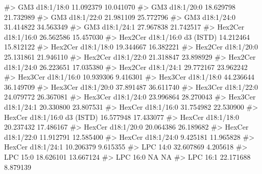 \documentclass[
  letterpaper,
  DIV=11,
  numbers=noendperiod]{scrreprt}
\newenvironment{Shaded}{\begin{snugshade}}{\end{snugshade}}
\newcommand{\CommentTok}[1]{\textcolor[rgb]{0.37,0.37,0.37}{#1}}
\begin{document}
\begin{Shaded}
\begin{Highlighting}[]
\CommentTok{\#\textgreater{} GM3 d18:1/18:0                            11.092379 10.041070}
\CommentTok{\#\textgreater{} GM3 d18:1/20:0                            18.629798 21.732989}
\CommentTok{\#\textgreater{} GM3 d18:1/22:0                            21.981109 25.772796}
\CommentTok{\#\textgreater{} GM3 d18:1/24:0                            31.414822 34.563349}
\CommentTok{\#\textgreater{} GM3 d18:1/24:1                            27.967838 21.742517}
\CommentTok{\#\textgreater{} Hex2Cer d18:1/16:0                        26.562586 15.457030}
\CommentTok{\#\textgreater{} Hex2Cer d18:1/16:0 d3 (ISTD)              14.212464 15.812122}
\CommentTok{\#\textgreater{} Hex2Cer d18:1/18:0                        19.344667 16.382221}
\CommentTok{\#\textgreater{} Hex2Cer d18:1/20:0                        25.131861 21.946110}
\CommentTok{\#\textgreater{} Hex2Cer d18:1/22:0                        21.318847 23.898929}
\CommentTok{\#\textgreater{} Hex2Cer d18:1/24:0                        26.223651 17.035380}
\CommentTok{\#\textgreater{} Hex2Cer d18:1/24:1                        29.772167 23.962242}
\CommentTok{\#\textgreater{} Hex3Cer d18:1/16:0                        10.939306  9.416301}
\CommentTok{\#\textgreater{} Hex3Cer d18:1/18:0                        44.236644 36.149709}
\CommentTok{\#\textgreater{} Hex3Cer d18:1/20:0                        37.891487 36.611740}
\CommentTok{\#\textgreater{} Hex3Cer d18:1/22:0                        24.079772 26.367081}
\CommentTok{\#\textgreater{} Hex3Cer d18:1/24:0                        23.996864 28.270043}
\CommentTok{\#\textgreater{} Hex3Cer d18:1/24:1                        20.330800 23.807531}
\CommentTok{\#\textgreater{} HexCer d18:1/16:0                         31.754982 22.530900}
\CommentTok{\#\textgreater{} HexCer d18:1/16:0 d3 (ISTD)               16.577948 17.433077}
\CommentTok{\#\textgreater{} HexCer d18:1/18:0                         20.237432 17.486167}
\CommentTok{\#\textgreater{} HexCer d18:1/20:0                         20.064386 26.189682}
\CommentTok{\#\textgreater{} HexCer d18:1/22:0                         11.912791 12.585400}
\CommentTok{\#\textgreater{} HexCer d18:1/24:0                          9.425181 11.965828}
\CommentTok{\#\textgreater{} HexCer d18:1/24:1                         10.206379  9.615355}
\CommentTok{\#\textgreater{} LPC 14:0                                  32.607869  4.205618}
\CommentTok{\#\textgreater{} LPC 15:0                                  18.626101 13.667124}
\CommentTok{\#\textgreater{} LPC 16:0                                         NA        NA}
\CommentTok{\#\textgreater{} LPC 16:1                                  22.171688  8.879139}

\end{Highlighting}
\end{Shaded}
\end{document}
